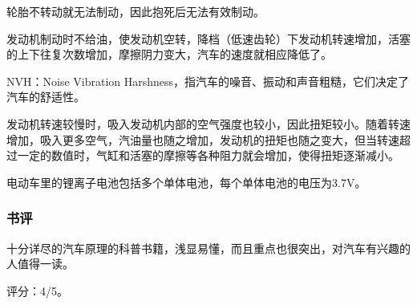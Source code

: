 轮胎不转动就无法制动，因此抱死后无法有效制动。

发动机制动时不给油，使发动机空转，降档（低速齿轮）下发动机转速增加，活塞的上下往复次数增加，摩擦阴力变大，汽车的速度就相应降低了。

NVH：Noise Vibration Harshness，指汽车的噪音、振动和声音粗糙，它们决定了汽车的舒适性。

发动机转速较慢时，吸入发动机内部的空气强度也较小，因此扭矩较小。随着转速增加，吸入更多空气，汽油量也随之增加，发动机的扭矩也随之变大，但当转速超过一定的数值时，气缸和活塞的摩擦等各种阻力就会增加，使得扭矩逐渐减小。

电动车里的锂离子电池包括多个单体电池，每个单体电池的电压为3.7V。

\subsubsection{书评}
十分详尽的汽车原理的科普书籍，浅显易懂，而且重点也很突出，对汽车有兴趣的人值得一读。

评分：4/5。